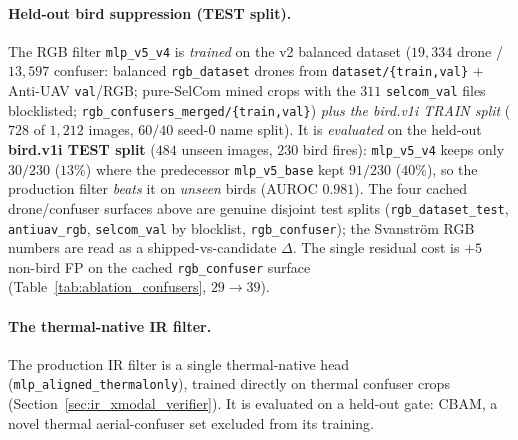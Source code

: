 \paragraph{Held-out bird suppression (TEST split).}
The RGB filter \texttt{mlp\_v5\_v4} is \emph{trained} on the v2 balanced dataset ($19{,}334$ drone / $13{,}597$ confuser: balanced \texttt{rgb\_dataset} drones from \texttt{dataset/\{train,val\}} $+$ Anti-UAV \texttt{val}/RGB; pure-SelCom mined crops with the $311$ \texttt{selcom\_val} files blocklisted; \texttt{rgb\_confusers\_merged/\{train,val\}}) \emph{plus the bird.v1i TRAIN split} ($728$ of $1{,}212$ images, $60/40$ seed-0 name split). It is \emph{evaluated} on the held-out \textbf{bird.v1i TEST split} ($484$ unseen images, $230$ bird fires): \texttt{mlp\_v5\_v4} keeps only $30/230$ ($13\%$) where the predecessor \texttt{mlp\_v5\_base} kept $91/230$ ($40\%$), so the production filter \emph{beats} it on \emph{unseen} birds (AUROC $0.981$). The four cached drone/confuser surfaces above are genuine disjoint test splits (\texttt{rgb\_dataset\_test}, \texttt{antiuav\_rgb}, \texttt{selcom\_val} by blocklist, \texttt{rgb\_confuser}); the Svanstr\"om RGB numbers are read as a shipped-vs-candidate $\Delta$. The single residual cost is $+5$ non-bird FP on the cached \texttt{rgb\_confuser} surface (Table~\ref{tab:ablation_confusers}, $29\to39$).

\paragraph{The thermal-native IR filter.}
\label{sec:grayscale_verifier}
The production IR filter is a single thermal-native head (\texttt{mlp\_aligned\_thermalonly}), trained directly on thermal confuser crops (Section~\ref{sec:ir_xmodal_verifier}). It is evaluated on a held-out gate: CBAM, a novel thermal aerial-confuser set excluded from its training.

